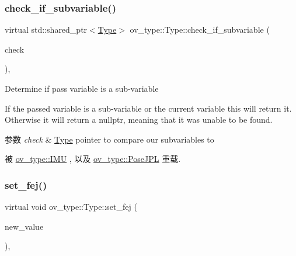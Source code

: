 \subsubsection{\texorpdfstring{check\+\_\+if\+\_\+subvariable()}{check\_if\_subvariable()}}
{\footnotesize\ttfamily virtual std\+::shared\+\_\+ptr$<$\hyperlink{classov__type_1_1Type}{Type}$>$ ov\+\_\+type\+::\+Type\+::check\+\_\+if\+\_\+subvariable (\begin{DoxyParamCaption}\item[{const std\+::shared\+\_\+ptr$<$ \hyperlink{classov__type_1_1Type}{Type} $>$}]{check }\end{DoxyParamCaption})\hspace{0.3cm}{\ttfamily [inline]}, {\ttfamily [virtual]}}



Determine if pass variable is a sub-\/variable 

If the passed variable is a sub-\/variable or the current variable this will return it. Otherwise it will return a nullptr, meaning that it was unable to be found.


\begin{DoxyParams}{参数}
{\em check} & \hyperlink{classov__type_1_1Type}{Type} pointer to compare our subvariables to \\
\hline
\end{DoxyParams}


被 \hyperlink{classov__type_1_1IMU_a3fb9631390473158abcdf97c71ea6e16}{ov\+\_\+type\+::\+I\+MU} , 以及 \hyperlink{classov__type_1_1PoseJPL_aa2138dce0eef761ebbeacc0136da34cc}{ov\+\_\+type\+::\+Pose\+J\+PL} 重载.

\mbox{\label{classov__type_1_1Type_ab8345946b27cb43e0cfc36454a06686d}} 
\subsubsection{\texorpdfstring{set\+\_\+fej()}{set\_fej()}}
{\footnotesize\ttfamily virtual void ov\+\_\+type\+::\+Type\+::set\+\_\+fej (\begin{DoxyParamCaption}\item[{const Eigen\+::\+Matrix\+Xd \&}]{new\+\_\+value }\end{DoxyParamCaption})\hspace{0.3cm}{\ttfamily [inline]}, {\ttfamily [virtual]}}



